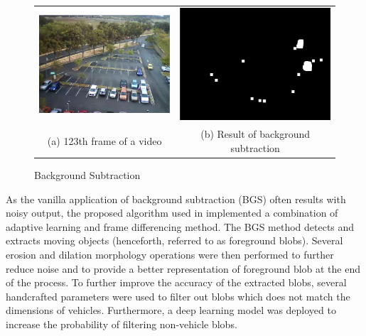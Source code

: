 \begin{figure}[htb!]
  \centering
\begin{tabular}{cc}
 \includegraphics[width=0.4\linewidth]{image/general/bgs1.png} &  \includegraphics[width=0.4\linewidth]{image/general/bgs2.png}  \\
(a) 123th frame of a video & (b) Result of background subtraction \\
\end{tabular}
\caption{Background Subtraction}
\label{fig:bgs}
\end{figure}

As the vanilla application of background subtraction (BGS) often results with noisy output, the proposed algorithm used in \cite{lim2017} implemented a combination of adaptive learning and frame differencing method. The BGS method detects and extracts moving objects (henceforth, referred to as foreground blobs).
Several erosion and dilation morphology operations were then performed to further reduce noise and to provide a better representation of foreground blob at the end of the process.
To further improve the accuracy of the extracted blobs, several handcrafted parameters were used to filter out blobs which does not match the dimensions of vehicles.
Furthermore, a deep learning model was deployed to increase the probability of filtering non-vehicle blobs.


